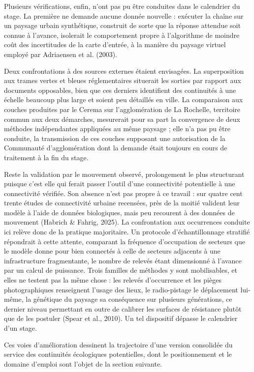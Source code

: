\documentclass[a4paper,12pt]{report}
\begin{document}
Plusieurs vérifications, enfin, n'ont pas pu être conduites dans le calendrier du stage. La première ne demande aucune donnée nouvelle : exécuter la chaîne sur un paysage urbain synthétique, construit de sorte que la réponse attendue soit connue à l'avance, isolerait le comportement propre à l'algorithme de moindre coût des incertitudes de la carte d'entrée, à la manière du paysage virtuel employé par Adriaensen et al. (2003).
 
Deux confrontations à des sources externes étaient envisagées. La superposition aux trames vertes et bleues réglementaires situerait les sorties par rapport aux documents opposables, bien que ces derniers identifient des continuités à une échelle beaucoup plus large et soient peu détaillés en ville. La comparaison aux couches produites par le Cerema sur l'agglomération de La Rochelle, territoire commun aux deux démarches, mesurerait pour sa part la convergence de deux méthodes indépendantes appliquées au même paysage ; elle n'a pas pu être conduite, la transmission de ces couches supposant une autorisation de la Communauté d'agglomération dont la demande était toujours en cours de traitement à la fin du stage.
 
Reste la validation par le mouvement observé, prolongement le plus structurant puisque c'est elle qui ferait passer l'outil d'une connectivité potentielle à une connectivité vérifiée. Son absence n'est pas propre à ce travail : sur quatre cent trente études de connectivité urbaine recensées, près de la moitié valident leur modèle à l'aide de données biologiques, mais peu recourent à des données de mouvement (Habrich \& Fahrig, 2025). La confrontation aux occurrences conduite ici relève donc de la pratique majoritaire. Un protocole d'échantillonnage stratifié répondrait à cette attente, comparant la fréquence d'occupation de secteurs que le modèle donne pour bien connectés à celle de secteurs adjacents à une infrastructure fragmentante, le nombre de relevés étant dimensionné à l'avance par un calcul de puissance. Trois familles de méthodes y sont mobilisables, et elles ne testent pas la même chose : les relevés d'occurrence et les pièges photographiques renseignent l'usage des lieux, le radio-pistage le déplacement lui-même, la génétique du paysage sa conséquence sur plusieurs générations, ce dernier niveau permettant en outre de calibrer les surfaces de résistance plutôt que de les postuler (Spear et al., 2010). Un tel dispositif dépasse le calendrier d'un stage.
 
Ces voies d'amélioration dessinent la trajectoire d'une version consolidée du service des continuités écologiques potentielles, dont le positionnement et le domaine d'emploi sont l'objet de la section suivante.
\end{document}
